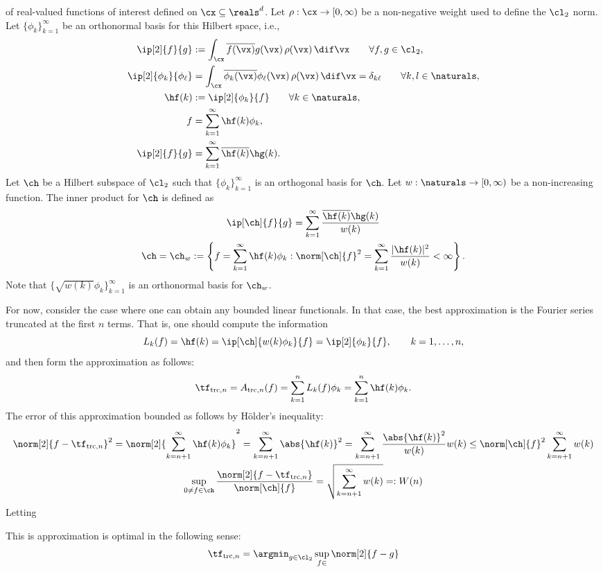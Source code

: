 \documentclass[final]{elsarticle}
\DeclareMathOperator{\trunc}{trc}
\theoremstyle{definition}
\theoremstyle{remark}
\begin{document}
of real-valued functions of interest defined on $\cx \subseteq \reals^d$.  Let $\rho: \cx \to [0,\infty)$ be a non-negative weight used to define the $\cl_2$ norm.  Let $\{\phi_k\}_{k=1}^{\infty}$ be an orthonormal basis for this Hilbert space, i.e., 
\begin{align*}
\ip[2]{f}{g} &:= \int_{\cx} \overline{f(\vx)} g(\vx) \, \rho(\vx) \, \dif \vx \qquad \forall f,g \in \cl_2,\\
\ip[2]{\phi_k}{\phi_{\ell}} &= \int_{\cx} \overline{\phi_k(\vx)} \phi_{\ell}(\vx) \, \rho(\vx) \, \dif \vx = \delta_{k\ell} \qquad \forall k,l \in \naturals,\\
\hf(k) &: = \ip[2]{\phi_k}{f} \qquad \forall k \in \naturals,\\
f &= \sum_{k=1}^{\infty} \hf(k) \phi_k, \\
\ip[2]{f}{g} &= \sum_{k=1}^\infty \overline{\hf(k)}\hg(k).
\end{align*}
Let $\ch$ be a Hilbert subspace of $\cl_2$ such that $\{\phi_k\}_{k=1}^{\infty}$ is an orthogonal basis for $\ch$.  Let $w:\naturals \to [0,\infty)$ be a non-increasing function.  The inner product for $\ch$ is defined as
\begin{gather*}
\ip[\ch]{f}{g} = \sum_{k=1}^\infty \frac{\overline{\hf(k)}\hg(k)}{w(k)} \\
\ch=\ch_{w} :=\left \{ f = \sum_{k=1}^{\infty} \hf(k) \phi_k : \norm[\ch]{f}^2 = \sum_{k=1}^\infty \frac{\lvert\hf(k)\rvert^2}{w(k)} < \infty \right\}.
\end{gather*}
Note that $\{\sqrt{w(k)}\phi_k\}_{k=1}^{\infty}$ is an orthonormal basis for $\ch_w$.

For now, consider the case where one can obtain any bounded linear functionals.  In that case, the best approximation is the Fourier series truncated at the first $n$ terms.  That is, one should compute the information 
\[
L_k(f) = \hf(k) = \ip[\ch]{w(k)\phi_k}{f}  = \ip[2]{\phi_k}{f}, \qquad k=1, \ldots, n,
\]
and then form the approximation as follows:
\[
\tf_{\trunc,n} = A_{\trunc,n}(f) = \sum_{k=1}^{n} L_k(f) \phi_k = \sum_{k=1}^{n} \hf(k) \phi_k.
\]
The error of this approximation bounded as follows by H\"older's inequality:
\begin{gather*}
\norm[2]{f - \tf_{\trunc,n}}^2 = \norm[2]{\sum_{k=n+1}^{\infty} \hf(k) \phi_k}^2 = \sum_{k=n+1}^{\infty} \abs{\hf(k)}^2 = \sum_{k=n+1}^{\infty} \frac{\abs{\hf(k)}^2}{w(k)} w(k) \le \norm[\ch]{f}^2 \sum_{k=n+1}^{\infty} w(k) \\
\sup_{0 \ne f \in \ch} \frac{\norm[2]{f - \tf_{\trunc,n}}}{\norm[\ch]{f}} =  \sqrt{\sum_{k=n+1}^{\infty} w(k)} =: W(n) \end{gather*}
Letting 


This is approximation is optimal in the following sense:
\[
\tf_{\trunc,n} = \argmin_{g \in \cl_2} \sup_{f \in } \norm[2]{f - g}
\]





\end{document}
